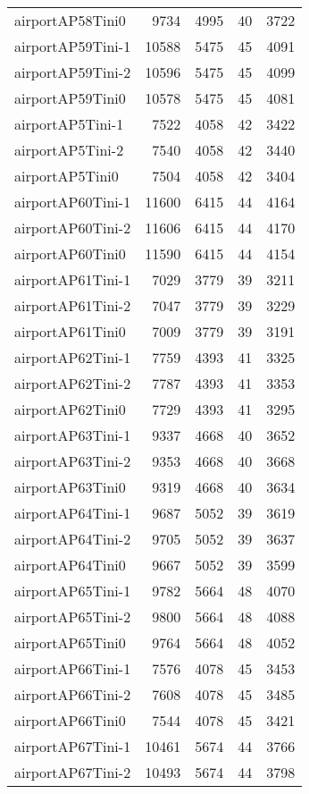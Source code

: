 \documentclass[../../../thesis.tex]{subfiles}
\begin{document}
\begin{longtable}{lrrrr}
airportAP58Tini0 & 9734 & 4995 & 40 & 3722 \\
airportAP59Tini-1 & 10588 & 5475 & 45 & 4091 \\
airportAP59Tini-2 & 10596 & 5475 & 45 & 4099 \\
airportAP59Tini0 & 10578 & 5475 & 45 & 4081 \\
airportAP5Tini-1 & 7522 & 4058 & 42 & 3422 \\
airportAP5Tini-2 & 7540 & 4058 & 42 & 3440 \\
airportAP5Tini0 & 7504 & 4058 & 42 & 3404 \\
airportAP60Tini-1 & 11600 & 6415 & 44 & 4164 \\
airportAP60Tini-2 & 11606 & 6415 & 44 & 4170 \\
airportAP60Tini0 & 11590 & 6415 & 44 & 4154 \\
airportAP61Tini-1 & 7029 & 3779 & 39 & 3211 \\
airportAP61Tini-2 & 7047 & 3779 & 39 & 3229 \\
airportAP61Tini0 & 7009 & 3779 & 39 & 3191 \\
airportAP62Tini-1 & 7759 & 4393 & 41 & 3325 \\
airportAP62Tini-2 & 7787 & 4393 & 41 & 3353 \\
airportAP62Tini0 & 7729 & 4393 & 41 & 3295 \\
airportAP63Tini-1 & 9337 & 4668 & 40 & 3652 \\
airportAP63Tini-2 & 9353 & 4668 & 40 & 3668 \\
airportAP63Tini0 & 9319 & 4668 & 40 & 3634 \\
airportAP64Tini-1 & 9687 & 5052 & 39 & 3619 \\
airportAP64Tini-2 & 9705 & 5052 & 39 & 3637 \\
airportAP64Tini0 & 9667 & 5052 & 39 & 3599 \\
airportAP65Tini-1 & 9782 & 5664 & 48 & 4070 \\
airportAP65Tini-2 & 9800 & 5664 & 48 & 4088 \\
airportAP65Tini0 & 9764 & 5664 & 48 & 4052 \\
airportAP66Tini-1 & 7576 & 4078 & 45 & 3453 \\
airportAP66Tini-2 & 7608 & 4078 & 45 & 3485 \\
airportAP66Tini0 & 7544 & 4078 & 45 & 3421 \\
airportAP67Tini-1 & 10461 & 5674 & 44 & 3766 \\
airportAP67Tini-2 & 10493 & 5674 & 44 & 3798 \\

\end{longtable}
\end{document}
